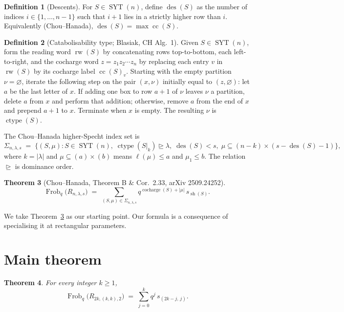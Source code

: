 \documentclass[11pt]{article}
\newtheorem{theorem}{Theorem}
\theoremstyle{definition}
\newtheorem{definition}[theorem]{Definition}
\theoremstyle{remark}
\DeclareMathOperator{\Frob}{Frob}
\DeclareMathOperator{\ctype}{ctype}
\DeclareMathOperator{\cocharge}{cocharge}
\DeclareMathOperator{\cc}{cc}
\DeclareMathOperator{\des}{des}
\DeclareMathOperator{\rw}{rw}
\DeclareMathOperator{\sh}{sh}
\DeclareMathOperator{\SYT}{SYT}
\newcommand{\dom}{\trianglerighteq}
\begin{document}
\begin{definition}[Descents]\label{def:des}
For $S \in \SYT(n)$, define $\des(S)$ as the number of indices $i \in
\{1,\ldots,n-1\}$ such that $i+1$ lies in a strictly higher row than $i$.
Equivalently (Chou--Hanada), $\des(S) = \max \cc(S)$.
\end{definition}

\begin{definition}[Catabolisability type; Blasiak, CH Alg.~1]\label{def:ctype}
Given $S \in \SYT(n)$, form the reading word $\rw(S)$ by concatenating rows
top-to-bottom, each left-to-right, and the cocharge word $z = z_1 z_2 \cdots z_n$
by replacing each entry $v$ in $\rw(S)$ by its cocharge label $\cc(S)_v$.
Starting with the empty partition $\nu = \varnothing$, iterate the following
step on the pair $(x,\nu)$ initially equal to $(z,\varnothing)$: let $a$ be the
last letter of $x$. If adding one box to row $a+1$ of $\nu$ leaves $\nu$ a
partition, delete $a$ from $x$ and perform that addition; otherwise, remove $a$
from the end of $x$ and prepend $a+1$ to $x$. Terminate when $x$ is empty. The
resulting $\nu$ is $\ctype(S)$.
\end{definition}

The Chou--Hanada higher-Specht index set is
\[
    \Sigma_{n,\lambda,s} \;=\; \bigl\{(S,\mu) : S \in \SYT(n),\;
        \ctype(S|_k) \dom \lambda,\; \des(S) < s,\;
        \mu \subseteq (n-k) \times (s - \des(S) - 1)\bigr\},
\]
where $k = |\lambda|$ and $\mu \subseteq (a)\times(b)$ means $\ell(\mu) \le a$
and $\mu_1 \le b$. The relation $\dom$ is dominance order.

\begin{theorem}[Chou--Hanada, Theorem B \& Cor.~2.33, {\rm arXiv 2509.24252}]
\label{thm:CH}
\[
    \Frob_q\bigl(R_{n,\lambda,s}\bigr)
    \;=\; \sum_{(S,\mu)\in\Sigma_{n,\lambda,s}} q^{\cocharge(S) + |\mu|}\,
        s_{\sh(S)}.
\]
\end{theorem}

We take Theorem~\ref{thm:CH} as our starting point. Our formula is a
consequence of specialising it at rectangular parameters.

\section{Main theorem}

\begin{theorem}\label{thm:main}
For every integer $k \ge 1$,
\[
    \Frob_q\bigl(R_{2k,(k,k),2}\bigr)
    \;=\; \sum_{j=0}^{k} q^{j}\, s_{(2k-j,\,j)}.
\]
\end{theorem}
\end{document}
